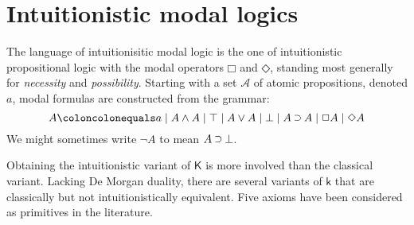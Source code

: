 \documentclass[twoside]{aiml18}
\newcommand{\B}{\mathcal{B}}
\newcommand*{\NOT}{\neg}
\newcommand*{\AND}{\mathbin{\wedge}}
\newcommand*{\TOP}{\mathord{\top}}
\newcommand*{\OR}{\mathbin{\vee}}
\newcommand*{\BOT}{\mathord{\bot}}
\newcommand*{\IMP}{\mathbin{\scalebox{.9}{\raise.2ex\hbox{$\supset$}}}}
\newcommand*{\BOX}{\mathord{\Box}}
\newcommand*{\DIA}{\mathord{\Diamond}}
\newcommand{\SEQ}{\Rightarrow}
\begin{document}









\section{Intuitionistic modal logics}

	The language of {intuitionisitic modal logic} is the one of intuitionistic propositional logic with the modal operators $\BOX$ and $\DIA$, standing most generally for \emph{necessity} and \emph{possibility}.
	Starting with a set $\mathcal{A}$ of atomic propositions, denoted $a$, modal formulas are constructed from the grammar:
	$$
	A \coloncolonequals
	a \mid A \AND A \mid \TOP \mid A \OR A \mid \BOT \mid A \IMP A \mid \BOX A \mid \DIA A
	$$
	We might sometimes write $\NOT A$ to mean $A \IMP \BOT$.

Obtaining the intuitionistic variant of $\mathsf{K}$ is more involved than the classical variant. 
Lacking De Morgan duality, there are several variants of $\mathsf{k}$ that are classically but not intuitionistically equivalent. Five axioms have been considered as primitives in the literature. 
%
\end{document}
